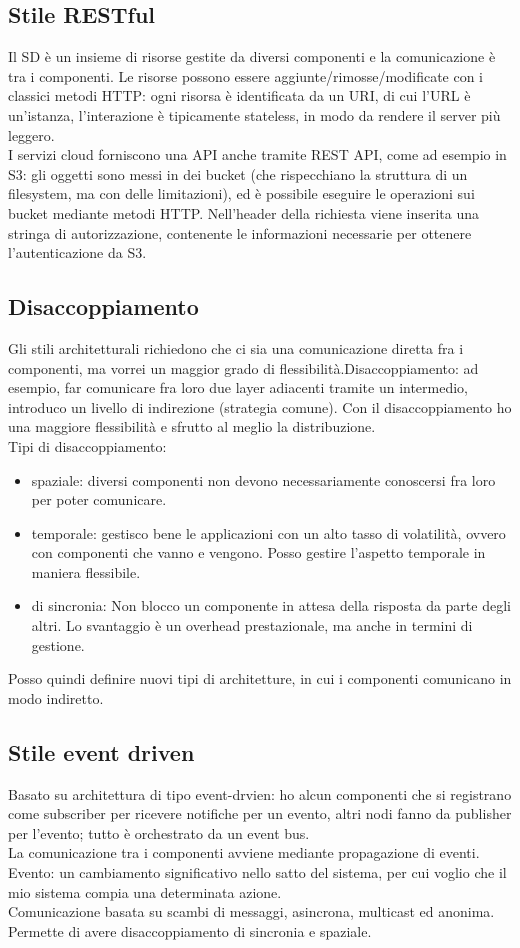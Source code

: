 \documentclass[16px]{article}
\begin{document}
\subsection{Stile RESTful}
Il SD è un insieme di risorse gestite da diversi componenti e la comunicazione è tra i componenti. Le risorse possono essere aggiunte/rimosse/modificate con i classici metodi HTTP: ogni risorsa è identificata da un URI, di cui l'URL è un'istanza, l'interazione è tipicamente stateless, in modo da rendere il server più leggero.\\ I servizi cloud forniscono una API anche tramite REST API, come ad esempio in S3: gli oggetti sono messi in dei bucket (che rispecchiano la struttura di un filesystem, ma con delle limitazioni), ed è possibile eseguire le operazioni sui bucket mediante metodi HTTP. Nell'header della richiesta viene inserita una stringa di autorizzazione, contenente le informazioni necessarie per ottenere l'autenticazione da S3.
\subsection{Disaccoppiamento}
Gli stili architetturali richiedono che ci sia una comunicazione diretta fra i componenti, ma vorrei un maggior grado di flessibilità.Disaccoppiamento: ad esempio, far comunicare fra loro due layer adiacenti tramite un intermedio, introduco un livello di indirezione (strategia comune). Con il disaccoppiamento ho una maggiore flessibilità e sfrutto al meglio la distribuzione.\\ Tipi di disaccoppiamento:
\begin{itemize}
\item spaziale: diversi componenti non devono necessariamente conoscersi fra loro per poter comunicare.
\item temporale: gestisco bene le applicazioni con un alto tasso di volatilità, ovvero con componenti che vanno e vengono. Posso gestire l'aspetto temporale in maniera flessibile.
\item di sincronia: Non blocco un componente in attesa della risposta da parte degli altri.
Lo svantaggio è un overhead prestazionale, ma anche in termini di gestione.
\end{itemize}
Posso quindi definire nuovi tipi di architetture, in cui i componenti comunicano in modo indiretto.
\subsection{Stile event driven}
Basato su architettura di tipo event-drvien: ho alcun componenti che si registrano come subscriber per ricevere notifiche per un evento, altri nodi fanno da publisher per l'evento; tutto è orchestrato da un event bus.\\ La comunicazione tra i componenti avviene mediante propagazione di eventi. Evento: un cambiamento significativo nello satto del sistema, per cui voglio che il mio sistema compia una determinata azione.\\ Comunicazione basata su scambi di messaggi, asincrona, multicast ed anonima.\\ Permette di avere disaccoppiamento di sincronia e spaziale.
\end{document}
